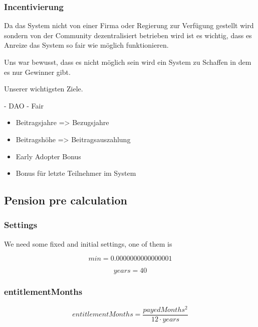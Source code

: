 \subsubsection{Incentivierung}

Da das System nicht von einer Firma oder Regierung zur Verfügung gestellt wird sondern von der Community dezentralisiert betrieben wird ist es wichtig, dass es Anreize das System so fair wie möglich funktionieren.

Uns war bewusst, dass es nicht möglich sein wird ein System zu Schaffen in dem es nur Gewinner gibt.

Unserer wichtigsten Ziele.

- DAO
- Fair



\begin{itemize}
\item Beitragsjahre => Bezugsjahre
\item Beitragshöhe => Beitragsauszahlung
\item Early Adopter Bonus
\item Bonus für letzte Teilnehmer im System
\end{itemize}


\newpage

\subsection{Pension pre calculation}

\subsubsection*{Settings}

We need some fixed and initial settings,
one of them is 

\begin{equation*}
	min = 0.0000000000000001
\end{equation*}

\begin{equation*}
	years = 40
\end{equation*}

\subsubsection*{entitlementMonths}

\begin{equation*}
	entitlementMonths = \frac{payedMonths^2}{12 \cdot years}
\end{equation*}

